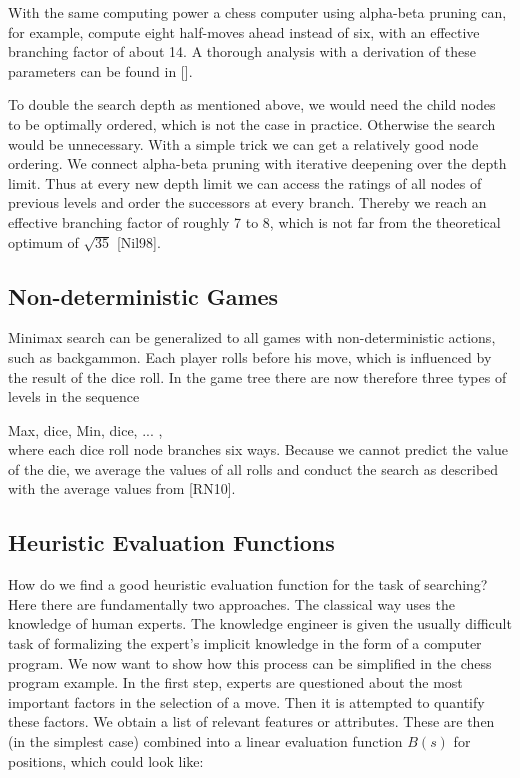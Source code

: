\documentclass[10pt]{book}
\begin{document}
With the same computing power a chess computer using alpha-beta pruning can, for example, compute eight half-moves ahead instead of six, with an effective branching factor of about 14. A thorough analysis with a derivation of these parameters can be found in [\cite{pearl1984heuristics}].

To double the search depth as mentioned above, we would need the child nodes to be optimally ordered, which is not the case in practice. Otherwise the search would be unnecessary. With a simple trick we can get a relatively good node ordering. We connect alpha-beta pruning with iterative deepening over the depth limit. Thus at every new depth limit we can access the ratings of all nodes of previous levels and order the successors at every branch. Thereby we reach an effective branching factor of roughly 7 to 8, which is not far from the theoretical optimum of $\sqrt{35}$ [Nil98].

\subsection{Non-deterministic Games}
Minimax search can be generalized to all games with non-deterministic actions, such as backgammon. Each player rolls before his move, which is influenced by the result of the dice roll. In the game tree there are now therefore three types of levels in the sequence

Max, dice, Min, dice, ... ,\\[0pt]
where each dice roll node branches six ways. Because we cannot predict the value of the die, we average the values of all rolls and conduct the search as described with the average values from [RN10].

\subsection{Heuristic Evaluation Functions}
How do we find a good heuristic evaluation function for the task of searching? Here there are fundamentally two approaches. The classical way uses the knowledge of human experts. The knowledge engineer is given the usually difficult task of formalizing the expert's implicit knowledge in the form of a computer program. We now want to show how this process can be simplified in the chess program example.
In the first step, experts are questioned about the most important factors in the selection of a move. Then it is attempted to quantify these factors. We obtain a list of relevant features or attributes. These are then (in the simplest case) combined into a linear evaluation function $B(s)$ for positions, which could look like:
\end{document}
